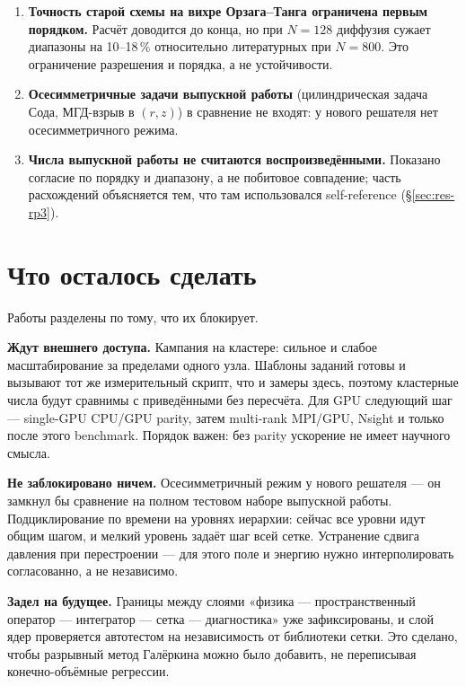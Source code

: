 \documentclass[12pt,a4paper]{article}
\begin{document}
\begin{enumerate}[nosep]
  «сетку» и «усреднение» на этой постановке нельзя.
\item \textbf{Точность старой схемы на вихре Орзага--Танга ограничена первым
  порядком.} Расчёт доводится до конца, но при $N=128$ диффузия сужает
  диапазоны на 10--18\,\% относительно литературных при $N=800$. Это
  ограничение разрешения и порядка, а не устойчивости.
\item \textbf{Осесимметричные задачи выпускной работы} (цилиндрическая задача
  Сода, МГД-взрыв в $(r,z)$) в сравнение не входят: у нового решателя нет
  осесимметричного режима.
\item \textbf{Числа выпускной работы не считаются воспроизведёнными.} Показано
  согласие по порядку и диапазону, а не побитовое совпадение; часть
  расхождений объясняется тем, что там использовался self-reference
  (\S\ref{sec:res-rp3}).
\end{enumerate}

\section{Что осталось сделать}
\label{sec:plan}

Работы разделены по тому, что их блокирует.

\textbf{Ждут внешнего доступа.} Кампания на кластере: сильное и слабое
масштабирование за пределами одного узла. Шаблоны заданий готовы и вызывают тот
же измерительный скрипт, что и замеры здесь, поэтому кластерные числа будут
сравнимы с приведёнными без пересчёта. Для GPU следующий шаг --- single-GPU
CPU/GPU parity, затем multi-rank MPI/GPU, Nsight и только после этого benchmark.
Порядок важен: без parity ускорение не имеет научного смысла.

\textbf{Не заблокировано ничем.} Осесимметричный режим у нового решателя ---
он замкнул бы сравнение на полном тестовом наборе выпускной работы. Подциклирование
по времени на уровнях иерархии: сейчас все уровни идут общим шагом, и мелкий
уровень задаёт шаг всей сетке. Устранение сдвига давления при перестроении ---
для этого поле и энергию нужно интерполировать согласованно, а не независимо.

\textbf{Задел на будущее.} Границы между слоями «физика --- пространственный
оператор --- интегратор --- сетка --- диагностика» уже зафиксированы, и слой ядер
проверяется автотестом на независимость от библиотеки сетки. Это сделано,
чтобы разрывный метод Галёркина можно было добавить, не переписывая
конечно-объёмные регрессии.
\end{document}
